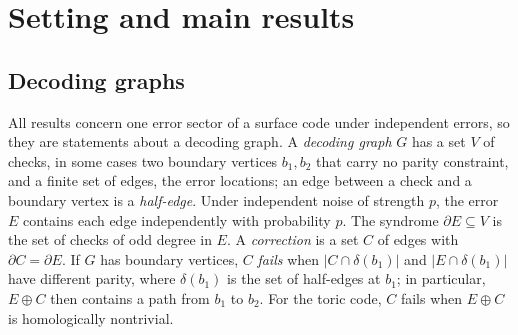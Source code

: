 \documentclass[11pt]{amsart}
\theoremstyle{definition}
\theoremstyle{remark}
\numberwithin{equation}{section}
\begin{document}
\section{Setting and main results}\label{sec:setting}

\subsection{Decoding graphs}\label{sec:graphs}
All results concern one error sector of a surface code under independent errors, so they are statements about a decoding graph. A \emph{decoding graph} $G$ has a set $V$ of checks, in some cases two boundary vertices $b_1,b_2$ that carry no parity constraint, and a finite set of edges, the error locations; an edge between a check and a boundary vertex is a \emph{half-edge}. Under independent noise of strength $p$, the error $E$ contains each edge independently with probability $p$. The syndrome $\partial E\subseteq V$ is the set of checks of odd degree in $E$. A \emph{correction} is a set $C$ of edges with $\partial C=\partial E$. If $G$ has boundary vertices, $C$ \emph{fails} when $|C\cap\delta(b_1)|$ and $|E\cap\delta(b_1)|$ have different parity, where $\delta(b_1)$ is the set of half-edges at $b_1$; in particular, $E\oplus C$ then contains a path from $b_1$ to $b_2$. For the toric code, $C$ fails when $E\oplus C$ is homologically nontrivial.
\end{document}
